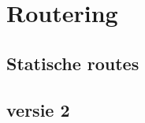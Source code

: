 \chapter{Routering}
\label{chap:routering}

\section{Statische routes}


\section{ versie 2}



\section{}